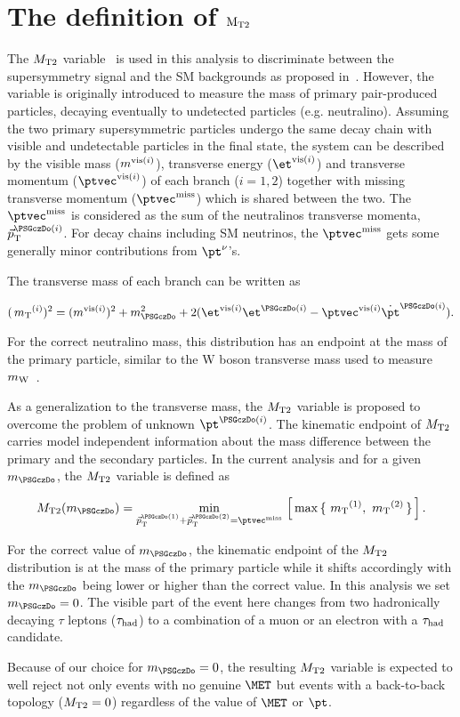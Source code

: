 \section{\texorpdfstring{The definition of $\rm {\ensuremath{{M_{\rm T2}}}}$}{The definition of MT2}}
\label{sect:mt2def}
The ${M_{\rm T2}}$ variable~\cite{Lester:1999tx,Barr:2003rg} is used in this analysis to discriminate between the supersymmetry signal and the SM backgrounds as proposed in~\cite{Barr:2009wu}. However, the variable is originally introduced to measure the mass of primary pair-produced particles, decaying eventually to undetected particles (e.g. neutralino). Assuming the two primary supersymmetric particles undergo the same decay chain with visible and undetectable particles in the final state, the system can be described by the visible mass ($m^{{\rm vis}(i)}$), transverse energy ($\etvisi$) and transverse momentum ($\vptvisi$) of each branch ($i=1,2$) together with missing transverse momentum ($\ptvecmiss$) which is shared between the two. The $\ptvecmiss$ is considered as the sum of the neutralinos transverse momenta, $\vec{p}_{\rm T}^{\PSGczDo(i)}$. For decay chains including SM neutrinos, the $\ptvecmiss$ gets some generally minor contributions from $\pt^{\nu}$'s.

The transverse mass of each branch can be written as 
\begin{linenomath}
\begin{equation}
\label{eq:mtdef}
(\mt^{(i)})^{2}= (\mvisi)^2+m^2_{\PSGczDo}+2(\etvisi\et^{\PSGczDo(i)}-\vptvisi\dot\pt^{\PSGczDo(i)}).
\end{equation}
\end{linenomath}
For the correct neutralino mass, this distribution has an endpoint at the mass of the primary particle, similar to the W boson transverse mass used to measure $m_{\rm W}$~\cite{Arnison:1983rp,Banner:1983jy,Affolder:2000bpa,Abazov:2002bu}. 

As a generalization to the transverse mass, the ${M_{\rm T2}}$ variable is proposed to overcome the problem of unknown $\pt^{\PSGczDo(i)}$. The kinematic endpoint of ${M_{\rm T2}}$ carries model independent information about the mass difference between the primary and the secondary particles. In the current analysis and for a given $m_{\PSGczDo}$, the ${M_{\rm T2}}$ variable is defined as
\begin{linenomath}
\begin{equation}
\label{eq:mt2def}
\mttwo(m_{\PSGczDo})= \min_{\vec{p}_{\rm T}^{\PSGczDo(1)}+\vec{p}_{\rm T}^{\PSGczDo(2)}=\ptvecmiss}\,\left[\,\max\,\{ \, \mt^{(1)},\,\mt^{(2)}\,\}\,\right].
\end{equation}
\end{linenomath}
For the correct value of $m_{\PSGczDo}$, the kinematic endpoint of the ${M_{\rm T2}}$ distribution is at the mass of the primary particle while it shifts accordingly with the $m_{\PSGczDo}$ being lower or higher than the correct value. In this analysis we set $m_{\PSGczDo}=0$. The visible part of the event here changes from two hadronically decaying $\tau$ leptons ($\tau_{\rm had}$) to a combination of a muon or an electron with a $\tau_{\rm had}$ candidate. 

Because of our choice for $m_{\PSGczDo}=0$, the resulting ${M_{\rm T2}}$ variable is expected to well reject not only events with no genuine $\MET$ but events with a back-to-back topology (${M_{\rm T2}}=0$) regardless of the value of $\MET$ or $\pt$. 
